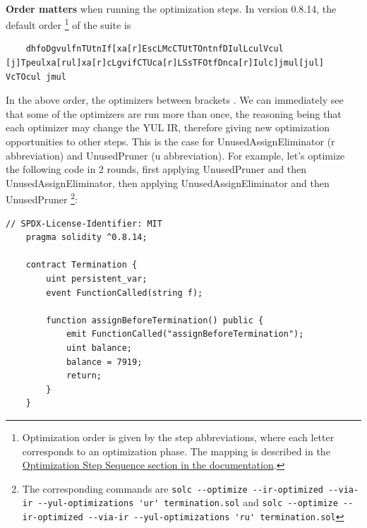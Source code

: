 \paragraph*{}
\textbf{Order matters} when running the optimization steps. In version 0.8.14, the default order \footnote{Optimization order is given by the step abbreviations, where each letter corresponds to an optimization phase. The mapping is described in the \href{https://docs.soliditylang.org/en/v0.8.14/yul.html}{Optimization Step Sequence section in the documentation}.} of the suite is

\begin{lstlisting}
    dhfoDgvulfnTUtnIf[xa[r]EscLMcCTUtTOntnfDIulLculVcul [j]Tpeulxa[rul]xa[r]cLgvifCTUca[r]LSsTFOtfDnca[r]Iulc]jmul[jul] VcTOcul jmul
\end{lstlisting}

In the above order, the optimizers between brackets \cite[will be applied multiple times in a loop until the Yul code remains unchanged or until the maximum number of rounds (currently 12)]{solidity-yul-optimizer}. We can immediately see that some of the optimizers are run more than once, the reasoning being that each optimizer may change the YUL IR, therefore giving new optimization opportunities to other steps. This is the case for UnusedAssignEliminator (r abbreviation) and UnusedPruner (u abbreviation). For example, let's optimize the following code in 2 rounds, first applying UnusedPruner and then UnusedAssignEliminator, then applying UnusedAssignEliminator and then UnusedPruner \footnote{The corresponding commands are \lstinline{solc --optimize --ir-optimized --via-ir --yul-optimizations 'ur' termination.sol} and \lstinline{solc --optimize --ir-optimized --via-ir --yul-optimizations 'ru' termination.sol}}:


\label{code:solidity-redundant-assignment}
\begin{lstlisting}[language=Solidity, caption=Example of a smart contract with a redundant assignment and variable declaration]
    // SPDX-License-Identifier: MIT
    pragma solidity ^0.8.14;

    contract Termination {
        uint persistent_var;
        event FunctionCalled(string f);

        function assignBeforeTermination() public {
            emit FunctionCalled("assignBeforeTermination");
            uint balance;
            balance = 7919;
            return;
        }
    }
\end{lstlisting}


